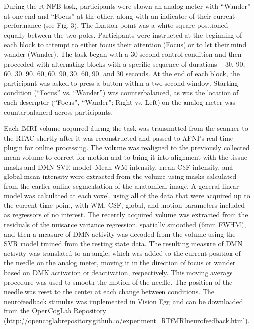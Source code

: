 During the rt-NFB task, participants were shown an analog meter with ``Wander'' at one end and     ``Focus'' at the other, along with an indicator of their current performance (see Fig. 3). The fixation point was a white square positioned equally between the two poles. Participants were instructed at the beginning of each block to attempt to either focus their attention (Focus) or to let their mind wander (Wander). The task began with a 30 second control condition and then proceeded with alternating blocks with a specific sequence of durations -- 30, 90, 60, 30, 90, 60, 60, 90, 30, 60, 90, and 30 seconds. At the end of each block, the participant was asked to press a button within a two second window. Starting condition (``Focus'' vs. ``Wander'') was counterbalanced, as was the location of each descriptor (``Focus'', ``Wander''; Right vs. Left) on the analog meter was counterbalanced across participants. 

Each fMRI volume acquired during the task was transmitted from the scanner to the RTAC shortly after it was reconstructed and passed to AFNI's real-time plugin \cite{Cox_1995} for online processing. The volume was realigned to the previously collected mean volume to correct for motion and to bring it into alignment with the tissue masks and DMN SVR model. Mean WM intensity, mean CSF intensity, and global mean intensity were extracted from the volume using masks calculated from the earlier online segmentation of the anatomical image. A general linear model was calculated at each voxel, using all of the data that were acquired up to the current time point, with WM, CSF, global, and motion parameters included as regressors of no interest. The recently acquired volume was extracted from the residuals of the nuisance variance regression, spatially smoothed (6mm FWHM), and then a measure of DMN activity was decoded from the volume using the SVR model trained from the resting state data. The resulting measure of DMN activity was translated to an angle, which was added to the current position of the needle on the analog meter, moving it in the direction of focus or wander based on DMN activation or deactivation, respectively. This moving average procedure was used to smooth the motion of the needle. The position of the needle was reset to the center at each change between conditions. The neurofeedback stimulus was implemented in Vision Egg \cite{Straw_2008} and can be downloaded from the OpenCogLab Repository (\href{http://opencoglabrepository.github.io/experiment_RTfMRIneurofeedback.html}{http://opencoglabrepository.github.io/experiment\_RTfMRIneurofeedback.html}).

